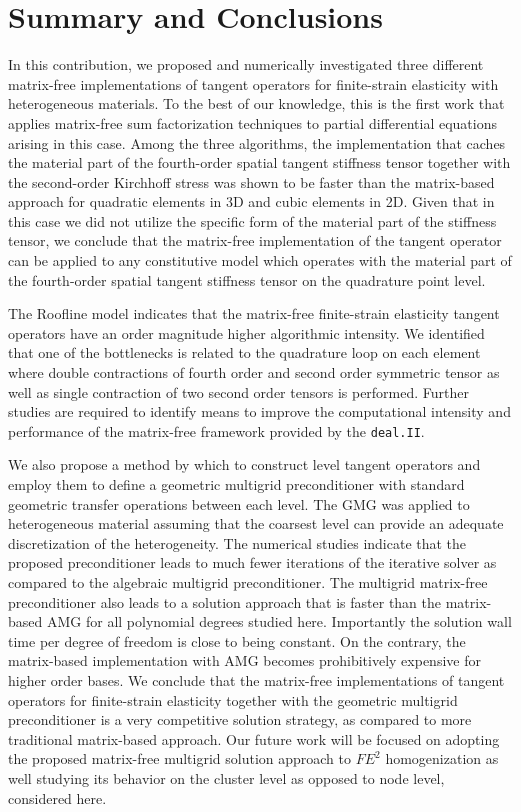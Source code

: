\documentclass[times,doublespace]{nmeauth}
\begin{document}
\section{Summary and Conclusions}
\label{sec:summary}

In this contribution, we proposed and numerically investigated {\color{red}three different} matrix-free implementations of tangent operators for finite-strain elasticity with heterogeneous materials.
{\color{red}
To the best of our knowledge, this is the first work that applies matrix-free sum factorization techniques to partial differential equations arising in this case.}
{\color{red}Among the three algorithms,}
the implementation that caches the material part of the fourth-order spatial tangent stiffness tensor together with the second-order Kirchhoff stress was shown to be faster than the matrix-based approach for quadratic elements in 3D and cubic {\color{red}elements in 2D}.
{\color{red}
Given that in this case we did not utilize the specific form of the material part of the stiffness tensor, we conclude}
that the matrix-free implementation of the tangent operator can be applied to any constitutive model which operates with the material part of the fourth-order spatial tangent stiffness tensor on the quadrature point level.

{\color{red}
The Roofline model indicates that the matrix-free finite-strain elasticity tangent operators have an order magnitude higher algorithmic intensity.
We identified that one of the bottlenecks is related to the quadrature loop on each element where double contractions of fourth order and second order symmetric tensor
as well as single contraction of two second order tensors is performed.
Further studies are required to identify means to improve the computational intensity and performance of the matrix-free framework provided by the \texttt{deal.II}.}

{\color{red}
We also propose a method by which to construct level tangent operators and employ them to define a geometric multigrid preconditioner
}
with standard geometric transfer operations between each level.
The GMG was applied to heterogeneous material assuming that the coarsest level can provide an adequate discretization of the heterogeneity.
The numerical studies indicate that the proposed preconditioner
{\color{red}
leads to much fewer iterations of the iterative solver as compared to the algebraic multigrid preconditioner.
The multigrid matrix-free preconditioner also}
leads to a solution approach that is faster than the matrix-based AMG {\color{red}for all polynomial degrees studied here.
Importantly the solution wall time per degree of freedom is close to being constant.
On the contrary, the matrix-based implementation with AMG becomes prohibitively expensive for higher order bases.
We conclude that the matrix-free implementations of tangent operators for finite-strain elasticity together with
the geometric multigrid preconditioner is a very competitive solution strategy, as compared to more traditional matrix-based approach.
Our future work will be focused on adopting the proposed matrix-free multigrid solution approach to $FE^2$ homogenization
as well studying its behavior on the cluster level as opposed to node level, considered here.}
\end{document}
